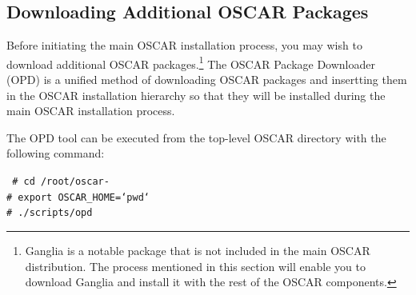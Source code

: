 



\subsection{Downloading Additional OSCAR Packages}
\label{det:opd}

\optional

Before initiating the main OSCAR installation process, you may wish to
download additional OSCAR packages.\footnote{Ganglia is a notable
  package that is not included in the main OSCAR distribution.  The
  process mentioned in this section will enable you to download
  Ganglia and install it with the rest of the OSCAR components.}  The
OSCAR Package Downloader (OPD) is a unified method of downloading
OSCAR packages and insertting them in the OSCAR installation hierarchy
so that they will be installed during the main OSCAR installation
process.

The OPD tool can be executed from the top-level OSCAR directory with
the following command:

\vspace{11pt}
{\tt
\# cd /root/oscar-\oscarversion \\
\indent \# export OSCAR\_HOME=`pwd` \\
\indent \# ./scripts/opd
}
\vspace{11pt}

